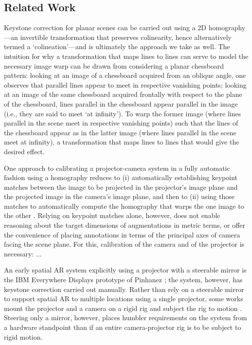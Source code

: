 \documentclass[review]{elsarticle}
\begin{document}
\subsection{Related Work}

Keystone correction for planar scenes can be carried out using a 2D homography \cite{Hartley2004}---an invertible transformation that preserves colinearity, hence alternatively termed a `colineation'---and is ultimately the approach we take as well. The intuition for why a transformation that maps lines to lines can serve to model the necessary image warp can be drawn from considering a planar chessboard pattern: looking at an image of a chessboard acquired from an oblique angle, one observes that parallel lines appear to meet in respective vanishing points; looking at an image of the same chessboard acquired frontally with respect to the plane of the chessboard, lines parallel in the chessboard appear parallel in the image (i.e., they are said to meet `at infinity'). To warp the former image (where lines parallel in the scene meet in respective vanishing points) such that the lines of the chessboard appear as in the latter image (where lines parallel in the scene meet at infinity), a transformation that maps lines to lines that would give the desired effect.

One approach to calibrating a projector-camera system in a fully automatic fashion using a homography reduces to (i) automatically establishing keypoint matches between the image to be projected in the projector's image plane and the projected image in the camera's image plane, and then to (ii) using those matches to automatically compute the homography that warps the one image to the other \cite{sukthankar2001smarter}. Relying on keypoint matches alone, however, does not enable reasoning about the target dimensions of augmentations in metric terms, or offer the convenience of placing annotations in terms of the principal axes of camera facing the scene plane. For this, calibration of the camera and of the projector is necessary: \cite{raskar2001self}...

An early spatial AR system explicitly using a projector with a steerable mirror is the IBM Everywhere Displays prototype of Pinhanez \cite{pinhanez2001everywhere}; the system, however, has keystone correction carried out manually. Rather than rely on a steerable mirror to support spatial AR to multiple locations using a single projector, some works mount the projector and a camera on a rigid rig and subject the rig to motion \cite{ehnes2004projected,borkowski2004spatial,butz2006applying}. Steering only a mirror, however, places humbler requirements on the system from a hardware standpoint than if an entire camera-projector rig is to be subject to rigid motion.
\end{document}
